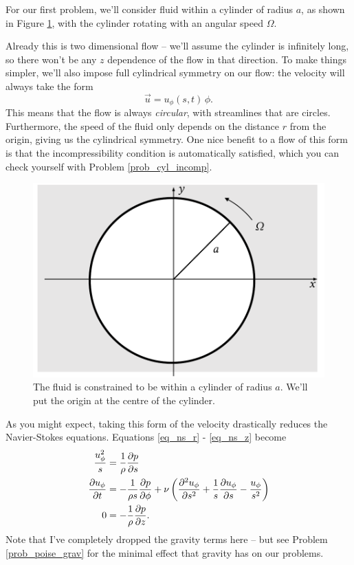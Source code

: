 For our first problem, we'll consider fluid within a cylinder of radius $a$, as shown in Figure \ref{fig_cyl_setup}, with the cylinder rotating with an angular speed $\Omega$. 

Already this is two dimensional flow -- we'll assume the cylinder is infinitely long, so there won't be any $z$ dependence of the flow in that direction.  To make things simpler, we'll also impose full cylindrical symmetry on our flow:  the velocity will always take the form
\begin{equation}
\vec{u} = u_\phi (s, t) \, \unit{\phi}.
\end{equation}
This means that the flow is always \emph{circular}, with streamlines that are circles.  Furthermore, the speed of the fluid only depends on the distance $r$ from the origin, giving us the cylindrical symmetry.  One nice benefit to a flow of this form is that the incompressibility condition is automatically satisfied, which you can check yourself with Problem \ref{prob_cyl_incomp}.

\begin{figure}
\centering
\includegraphics[width=0.7\linewidth]{Figures/Chapter2/fig_cyl_setup}
\caption{The fluid is constrained to be within a cylinder of radius $a$.  We'll put the origin at the centre of the cylinder.}
\label{fig_cyl_setup}
\end{figure}

As you might expect, taking this form of the velocity drastically reduces the Navier-Stokes equations.  Equations \ref{eq_ns_r} - \ref{eq_ns_z} become
\begin{align}
\frac{u_\phi^2}{s} & = \frac{1}{\rho} \frac{\partial {p}}{\partial {s}} \\
\label{eq_ns_theta2}
\frac{\partial {u_\phi}}{\partial {t}} & = -\frac{1}{\rho s} \frac{\partial {p}}{\partial {\phi}} + \nu \left( \frac{\partial^2 {u_\phi}}{\partial {s}^2} + \frac{1}{s} \frac{\partial {u_\phi}}{\partial {s}} - \frac{u_\phi}{s^2} \right) \\
\label{eq_ns_z2}
0 & = -\frac{1}{\rho} \frac{\partial {p}}{\partial {z}}.
\end{align}
Note that I've completely dropped the gravity terms here -- but see Problem \ref{prob_poise_grav} for the minimal effect that gravity has on our problems.

